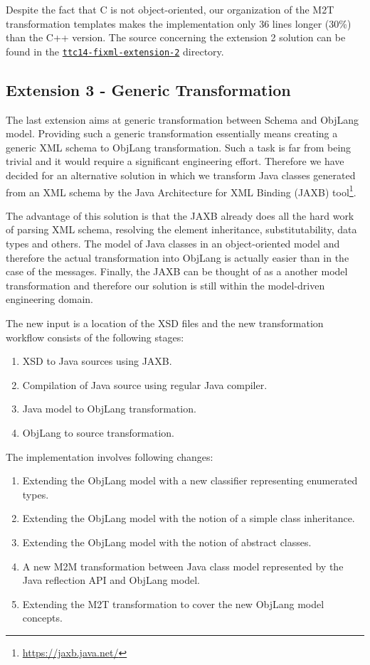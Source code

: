 Despite the fact that C is not object-oriented, our organization of the M2T transformation templates makes the implementation only 36 lines longer (30\%) than the C++ version.
The source concerning the extension 2 solution can be found in the \href{https://github.com/fikovnik/ttc14-fixml-sigma/tree/master/ttc14-fixml-extension-2}{\texttt{ttc14-fixml-extension-2}} directory.

\subsection{Extension 3 - Generic Transformation}
\label{sec:Extension3}

The last extension aims at generic transformation between \FIXML Schema and ObjLang model.
Providing such a generic transformation essentially means creating a generic XML schema to ObjLang transformation.
Such a task is far from being trivial and it would require a significant engineering effort.
Therefore we have decided for an alternative solution in which we transform Java classes generated from an XML schema by the Java Architecture for XML Binding (JAXB) tool\footnote{\url{https://jaxb.java.net/}}.

The advantage of this solution is that the JAXB already does all the hard work of parsing XML schema, resolving the element inheritance, substitutability, data types and others.
The model of Java classes in an object-oriented model and therefore the actual transformation into ObjLang is actually easier than in the case of the \FIXML messages.
Finally, the JAXB can be thought of as a another model transformation and therefore our solution is still within the model-driven engineering domain.

The new input is a location of the \FIXML XSD files and the new transformation workflow consists of the following stages:
\begin{enumerate}[(1)]
	\item XSD to Java sources using JAXB.
	\item Compilation of Java source using regular Java compiler.
	\item Java model to ObjLang transformation.
	\item ObjLang to source transformation.
\end{enumerate}

\bigskip

The implementation involves following changes:
\begin{enumerate}[(1)]
	\item Extending the ObjLang model with a new classifier representing enumerated types.
	\item Extending the ObjLang model with the notion of a simple class inheritance.
	\item Extending the ObjLang model with the notion of abstract classes.
	\item A new M2M transformation between Java class model represented by the Java reflection API and ObjLang model.
	\item Extending the M2T transformation to cover the new ObjLang model concepts.
\end{enumerate}

